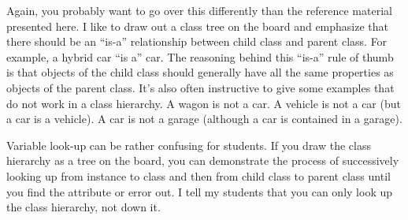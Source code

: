 \begin{meta}
Again, you probably want to go over this differently than the reference material presented here. I like to draw out a class tree on the board and emphasize that there should be an ``is-a'' relationship between child class and parent class. For example, a hybrid car ``is a'' car. The reasoning behind this ``is-a'' rule of thumb is that objects of the child class should generally have all the same properties as objects of the parent class. It's also often instructive to give some examples that do not work in a class hierarchy. A wagon is not a car. A vehicle is not a car (but a car is a vehicle). A car is not a garage (although a car is contained in a garage). 

Variable look-up can be rather confusing for students. If you draw the class hierarchy as a tree on the board, you can demonstrate the process of successively looking up from instance to class and then from child class to parent class until you find the attribute or error out. I tell my students that you can only look up the class hierarchy, not down it. 
\end{meta}